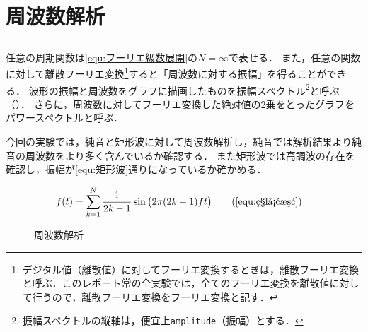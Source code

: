 \chapter{周波数解析}
\section{\kadaiba}\label{sec:\kadaiba}
\purpose
任意の周期関数は\eqref{equ:フーリエ級数展開}の\(N=\infty\)で表せる．
また，任意の関数に対して離散フーリエ変換\footnote{デジタル値（離散値）に対してフーリエ変換するときは，離散フーリエ変換と呼ぶ．このレポート常の全実験では，全てのフーリエ変換を離散値に対して行うので，離散フーリエ変換をフーリエ変換と記す．}すると「周波数に対する振幅」を得ることができる．
波形の振幅と周波数をグラフに描画したものを振幅スペクトル\footnote{振幅スペクトルの縦軸は，便宜上\texttt{amplitude}（振幅）とする．}と呼ぶ（）．
さらに，周波数に対してフーリエ変換した絶対値の2乗をとったグラフをパワースペクトルと呼ぶ．\par
今回の実験では，純音と矩形波に対して周波数解析し，純音では解析結果より純音の周波数をより多く含んでいるか確認する．
また矩形波では高調波の存在を確認し，振幅が\eqref{equ:矩形波}通りになっているか確かめる．
\begin{figure}[H]
    \centering
    \begin{minipage}{.62\textwidth}
        \begin{minipage}{.48\textwidth}
            \centering
            
        \end{minipage}
        \begin{minipage}{.48\textwidth}
            \centering
            \scalebox{0.8}{}
        \end{minipage}
        \caption{周波数解析}
        \label{fig:周波数解析}
    \end{minipage}
    \begin{minipage}{.37\textwidth}
        \begin{align}
            f(t) & =\sum_{k=1}^{N}\frac{1}{2k-1}\sin\big(2\pi(2k-1)ft\big)\tag{\ref{equ:矩形波}}
        \end{align}
    \end{minipage}
\end{figure}
\method
